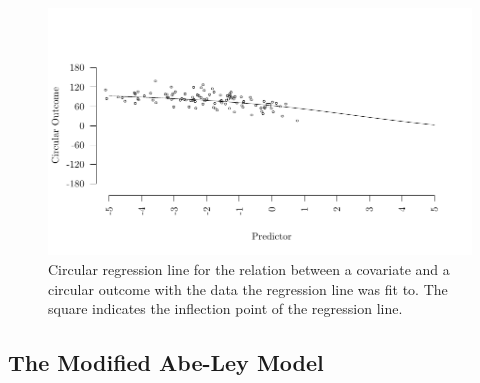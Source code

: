 \documentclass[man,mask]{apa6}
\begin{document}
\begin{figure}[]
  \includegraphics[width = \textwidth]{Plots/circregline.pdf}
  \caption{Circular regression line for the relation between a covariate and a circular outcome with the data the regression line was fit to. The square indicates the inflection point of the regression line.}
  \label{circregline}
\end{figure}

\vspace{-0.75cm}
\subsection{The Modified Abe-Ley Model}\label{WeiSSVM}
\vspace{-0.75cm}
\end{document}
